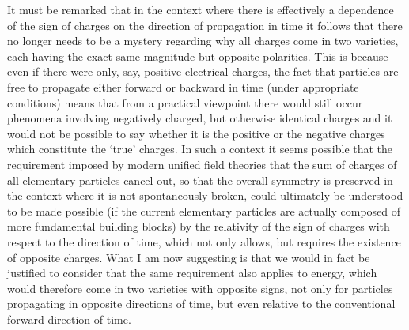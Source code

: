\documentclass[notitlepage,12pt]{report}
\begin{document}
It must be remarked that in the context where there is effectively a dependence of the sign of charges on the direction of propagation in time it follows that there no longer needs to be a mystery regarding why all charges come in two varieties, each having the exact same magnitude but opposite polarities. This is because even if there were only, say, positive electrical charges, the fact that particles are free to propagate either forward or backward in time (under appropriate conditions) means that from a practical viewpoint there would still occur phenomena involving negatively charged, but otherwise identical charges and it would not be possible to say whether it is the positive or the negative charges which constitute the `true' charges. In such a context it seems possible that the requirement imposed by modern unified field theories that the sum of charges of all elementary particles cancel out, so that the overall symmetry is preserved in the context where it is not spontaneously broken, could ultimately be understood to be made possible (if the current elementary particles are actually composed of more fundamental building blocks) by the relativity of the sign of charges with respect to the direction of time, which not only allows, but requires the existence of opposite charges. What I am now suggesting is that we would in fact be justified to consider that the same requirement also applies to energy, which would therefore come in two varieties with opposite signs, not only for particles propagating in opposite directions of time, but even relative to the conventional forward direction of time.
\end{document}
